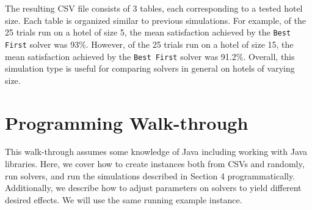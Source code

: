 \documentclass[11 pt]{article}
\begin{document}
\vspace{-0.5cm}
\par The resulting CSV file consists of 3 tables, each corresponding to a tested hotel size. Each table is organized similar to previous simulations. For example, of the 25 trials run on a hotel of size 5, the mean satisfaction achieved by the \texttt{Best First} solver was 93\%. However, of the 25 trials run on a hotel of size 15, the mean satisfaction achieved by the \texttt{Best First} solver was 91.2\%. Overall, this simulation type is useful for comparing solvers in general on hotels of varying size.
\section{Programming Walk-through}
This walk-through assumes some knowledge of Java including working with Java libraries. Here, we cover how to create instances both from CSVs and randomly, run solvers, and run the simulations described in Section 4 programmatically. Additionally, we describe how to adjust parameters on solvers to yield different desired effects. We will use the same running example instance.
\end{document}
